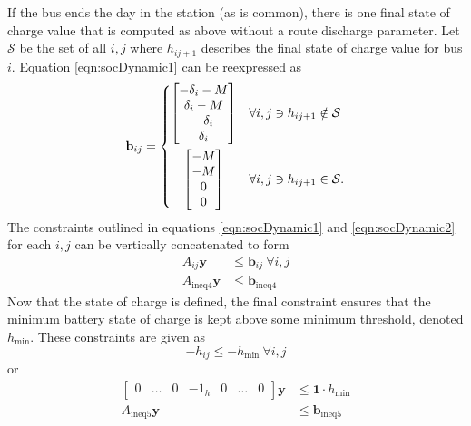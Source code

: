 If the bus ends the day in the station (as is common), there is one final state of charge value that is computed as above without a route discharge parameter. Let $\mathcal{S}$ be the set of all $i,j$ where $h_{ij+1}$ describes the final state of charge value for bus $i$. Equation \ref{eqn:socDynamic1} can be reexpressed as 
\begin{equation}\label{eqn:socDynamic2} 
	\mathbf{b}_{ij} = 
	\begin{dcases}
		\begin{bmatrix} -\delta_i - M \\
			         \delta_i - M \\
		                -\delta_i     \\
		                 \delta_i 
		\end{bmatrix} & \forall i,j \ni h_{ij+1} \notin \mathcal{S} \\
		\omit \hfil$\begin{bmatrix} - M \\
		                - M \\
		                  0 \\
		                  0 
		\end{bmatrix}$\hfil & \forall i,j \ni h_{ij+1} \in \mathcal{S}.
	\end{dcases}
\end{equation}
The constraints outlined in equations \ref{eqn:socDynamic1} and \ref{eqn:socDynamic2} for each $i,j$ can be vertically concatenated to form
\begin{equation}\label{eqn:socDynamic3} \begin{aligned}
	A_{ij}\mathbf{y} &\le \mathbf{b}_{ij} \ \forall i,j \\
	A_{\text{ineq4}}\mathbf{y} &\le \mathbf{b}_{\text{ineq4}}
\end{aligned} \end{equation}
Now that the state of charge is defined, the final constraint ensures that the minimum battery state of charge is kept above some minimum threshold, denoted $h_{\text{min}}$. These constraints are given as
\begin{equation}
	-h_{ij} \le -h_{\text{min}} \ \forall i,j
\end{equation}
or 
\begin{equation} \begin{aligned}
	\begin{bmatrix}0 & \hdots & 0 & -1_{h} & 0 & \hdots & 0\end{bmatrix} \mathbf{y} &\le \mathbf{1}\cdot h_{\text{min}}\\ 
		A_{\text{ineq5}}\mathbf{y} &\le \mathbf{b}_{\text{ineq5}}
\end{aligned} \end{equation}

